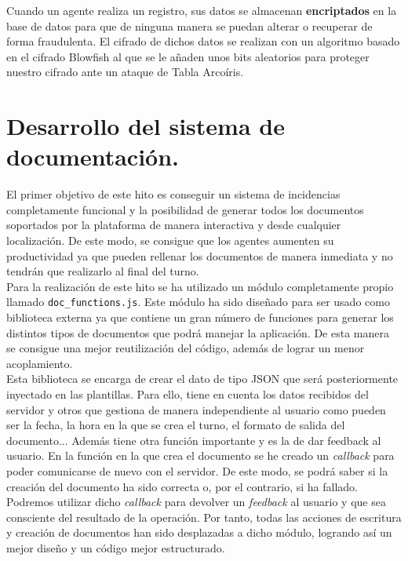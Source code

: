 Cuando un agente realiza un registro, sus datos se almacenan \textbf{encriptados} en la base de datos para que de ninguna manera
se puedan alterar o recuperar de forma fraudulenta. El cifrado de dichos datos se realizan con un algoritmo basado en el cifrado
Blowfish\cite{blowfish} al que se le añaden unos bits aleatorios para proteger nuestro cifrado ante un ataque de Tabla Arcoíris\cite{rainbow}.


\section{Desarrollo del sistema de documentación.}

El primer objetivo de este hito es conseguir un sistema de incidencias completamente funcional y la posibilidad de generar todos los documentos
soportados por la plataforma de manera interactiva y desde cualquier localización. De este modo, se consigue que los agentes aumenten su 
productividad ya que pueden rellenar los documentos de manera inmediata y no tendrán que realizarlo al final del turno.\\

Para la realización de este hito se ha utilizado un módulo completamente propio llamado  \verb|doc_functions.js|. Este módulo ha sido diseñado para ser usado
como biblioteca externa ya que contiene un gran número de funciones para generar los distintos tipos de documentos que podrá manejar la aplicación. De esta manera
se consigue una mejor reutilización del código, además de lograr un menor acoplamiento.\\

Esta biblioteca se encarga de crear el dato de tipo JSON que será posteriormente inyectado en las plantillas. Para ello, tiene en cuenta los datos recibidos
del servidor y otros que gestiona de manera independiente al usuario como pueden ser la fecha, la hora en la que se crea el turno, el formato de salida del 
documento... Además tiene otra función importante y es la de dar feedback al usuario. En la función en la que crea el documento se he creado un \textit{callback}
para poder comunicarse de nuevo con el servidor. De este modo, se podrá saber si la creación del documento ha sido correcta o, por el contrario, si ha fallado.
Podremos utilizar dicho \textit{callback} para devolver un \textit{feedback} al usuario y que sea consciente del resultado de la operación. Por tanto, todas las 
acciones de escritura y creación de documentos han sido desplazadas a dicho módulo, logrando así un mejor diseño y un código mejor estructurado.
\\

